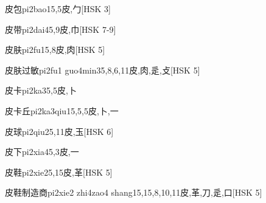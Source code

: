 \begin{EntryWithPhonetic}{皮包}{pi2bao1}{5,5}{⽪,⼓}[HSK 3]
\end{EntryWithPhonetic}

\begin{EntryWithPhonetic}{皮带}{pi2dai4}{5,9}{⽪,⼱}[HSK 7-9]
\end{EntryWithPhonetic}

\begin{EntryWithPhonetic}{皮肤}{pi2fu1}{5,8}{⽪,⾁}[HSK 5]
\end{EntryWithPhonetic}

\begin{EntryWithPhonetic}{皮肤过敏}{pi2fu1 guo4min3}{5,8,6,11}{⽪,⾁,⾡,⽁}[HSK 5]
\end{EntryWithPhonetic}

\begin{EntryWithPhonetic}{皮卡}{pi2ka3}{5,5}{⽪,⼘}
\end{EntryWithPhonetic}

\begin{EntryWithPhonetic}{皮卡丘}{pi2ka3qiu1}{5,5,5}{⽪,⼘,⼀}
\end{EntryWithPhonetic}

\begin{EntryWithPhonetic}{皮球}{pi2qiu2}{5,11}{⽪,⽟}[HSK 6]
\end{EntryWithPhonetic}

\begin{EntryWithPhonetic}{皮下}{pi2xia4}{5,3}{⽪,⼀}
\end{EntryWithPhonetic}

\begin{EntryWithPhonetic}{皮鞋}{pi2xie2}{5,15}{⽪,⾰}[HSK 5]
\end{EntryWithPhonetic}

\begin{EntryWithPhonetic}{皮鞋制造商}{pi2xie2 zhi4zao4 shang1}{5,15,8,10,11}{⽪,⾰,⼑,⾡,⼝}[HSK 5]
\end{EntryWithPhonetic}

